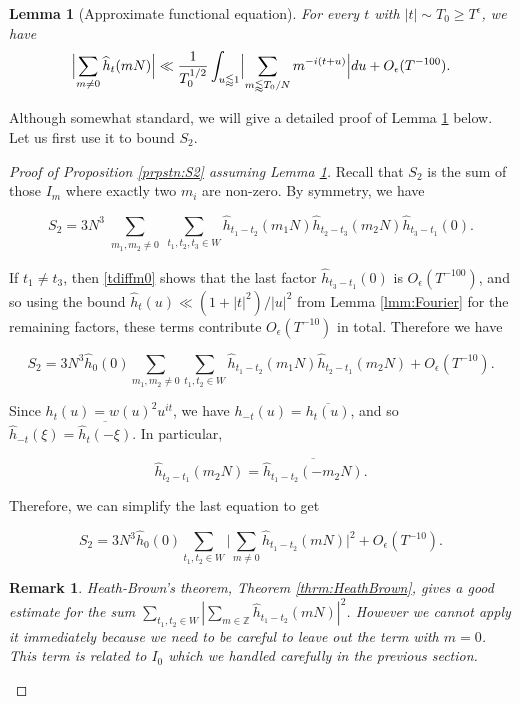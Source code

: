 \documentclass{amsart}
\theoremstyle{plain}
\newtheorem{lmm}[thrm]{Lemma}
\newtheorem*{rmk}{Remark}
\numberwithin{equation}{section}
\newcommand{\ZZ}{\mathbb{Z}}
\begin{document}
%
%

\begin{lmm}[Approximate functional equation] \label{lmmappfunceq} For every $t$ with $|t| \sim T_0\ge T^\epsilon$, we have
\[
 \Bigl| \sum_{m \not= 0} \widehat{h}_t(mN) \Bigr| \ll \frac{1}{T_0^{1/2}} \int_{u\lessapprox 1}\Bigl| \sum_{m \lessapprox T_0/N} m^{-i(t+u)} \Bigr|du + O_\epsilon( T^{-100} ). 
 \]
 \end{lmm}


Although somewhat standard, we will give a detailed proof of Lemma \ref{lmmappfunceq} below.   Let us first use it to bound $S_2$.  

\begin{proof}[Proof of Proposition \ref{prpstn:S2} assuming Lemma \ref{lmmappfunceq}]
Recall that $S_2$ is the sum of those $I_m$ where exactly two $m_i$ are non-zero.   By symmetry,  we have

\[
S_2 = 3 N^3 \sum_{\substack{m_1, m_2 \not= 0}} \sum_{t_1,t_2, t_3\in W}\widehat{h}_{t_1-t_2}(m_1N)\widehat{h}_{t_2-t_3}(m_2N) \widehat{h}_{t_3 -t_1} (0).
\]

If $t_1 \not= t_3$,  then \eqref{tdiffm0} shows that the last factor $\widehat{h}_{t_3-t_1}(0)$ is $O_\epsilon(T^{-100})$, and so using the bound $\widehat{h}_t(u)\ll (1+|t|^2)/|u|^2$ from Lemma \ref{lmm:Fourier} for the remaining factors, these terms contribute $O_\epsilon(T^{-10})$ in total.   Therefore we have

\[
 S_2 =  3N^3\widehat{h}_{0} (0)\sum_{m_1,m_2\ne 0}  \sum_{t_1,t_2\in W}\widehat{h}_{t_1-t_2}(m_1N)\widehat{h}_{t_2-t_1}(m_2N) +O_\epsilon(T^{-10}).
 \]
 
Since $h_t(u) = w(u)^2 u^{it}$,  we have $h_{-t}(u) = \overline{h_t(u)}$,  and so $ \widehat{h}_{-t} (\xi) = \overline{ \widehat{h}_t( - \xi) }$. In particular,

\[
 \widehat{h}_{t_2-t_1} (m_2N) = \overline{ \widehat{h}_{t_1-t_2}( - m_2N) }. 
 \]
 
Therefore, we can simplify the last equation to get

\[
 S_2 =3N^3 \widehat{h}_0(0)\sum_{t_1, t_2 \in W} \Big| \sum_{m\ne 0} \widehat{h}_{t_1-t_2}(m N) \Big|^2+O_\epsilon(T^{-10}).
  \]

\begin{rmk}  Heath-Brown's theorem, Theorem \ref{thrm:HeathBrown}, 
gives a good estimate for the sum $\sum_{t_1,  t_2 \in W} | \sum_{m \in \ZZ} \widehat{h}_{t_1 - t_2}(mN) |^2$.   However we cannot apply it immediately because we need to be careful to leave out the term with $m=0$.   This term is related to $I_0$ which we handled carefully in the previous section.  
\end{rmk}


\end{proof}
\end{document}

